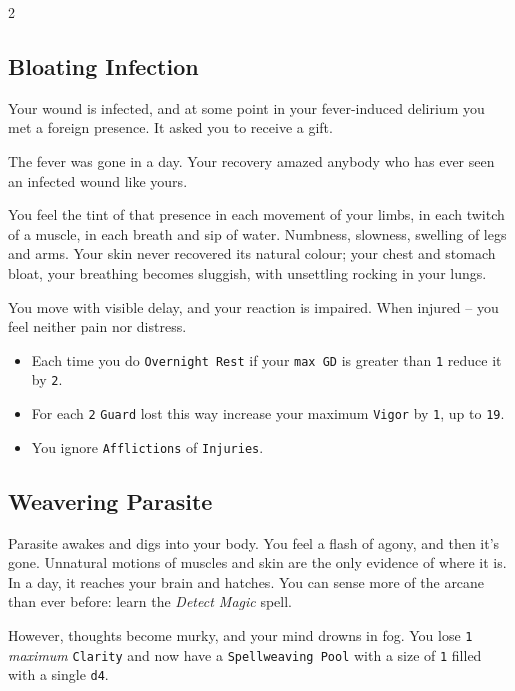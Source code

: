 \begin{multicols*}{2}
\subsection*{Bloating Infection}

Your wound is infected, and at some point in your fever-induced delirium you met a foreign presence.
It asked you to receive a gift.

The fever was gone in a day. Your recovery amazed anybody who has ever seen an infected wound like yours.

You feel the tint of that presence in each movement of your limbs, in each twitch of a muscle, in each breath and sip of water.
Numbness, slowness, swelling of legs and arms. Your skin never recovered its natural colour; your chest and stomach bloat, your breathing becomes sluggish, with unsettling rocking in your lungs.

You move with visible delay, and your reaction is impaired.
When injured -- you feel neither pain nor distress.

\begin{itemize}[nosep, leftmargin=*]
    \item Each time you do \texttt{Overnight Rest} if your \texttt{max GD} is greater than \texttt{1} reduce it by \texttt{2}.
    \item For each \texttt{2} \texttt{Guard} lost this way increase your maximum \texttt{Vigor} by \texttt{1}, up to \texttt{19}.
    \item You ignore \texttt{Afflictions} of \texttt{Injuries}.
\end{itemize}

\subsection*{Weavering Parasite}

Parasite awakes and digs into your body.
You feel a flash of agony, and then it's gone. Unnatural motions of muscles and skin are the only evidence of where it is.
In a day, it reaches your brain and hatches. You can sense more of the arcane than ever before: learn the \textit{Detect Magic} spell.

However, thoughts become murky, and your mind drowns in fog. 
You lose \texttt{1} \textit{maximum} \texttt{Clarity} and now have a \texttt{Spellweaving Pool} with a size of \texttt{1} filled with a single \texttt{d4}.


\end{multicols*}
